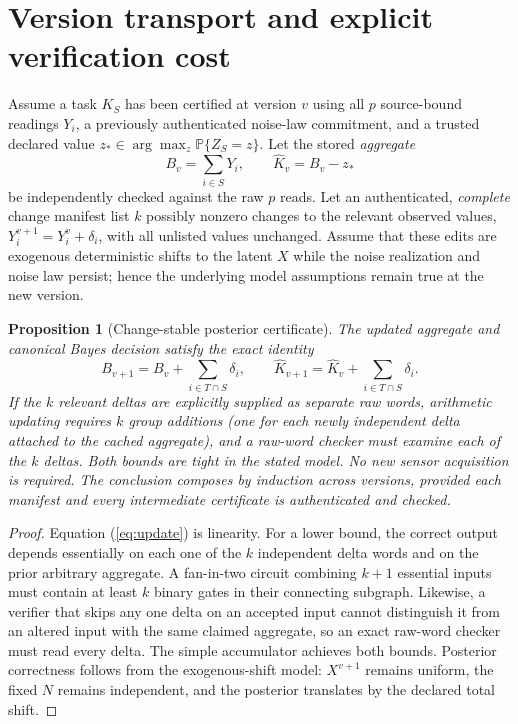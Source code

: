 \documentclass[11pt,letterpaper]{article}
\newtheorem{proposition}[theorem]{Proposition}
\newcommand{\Prb}{\mathbb P}
\begin{document}
\section{Version transport and explicit verification cost}
Assume a task \(K_S\) has been certified at version \(v\) using all \(p\) source-bound readings \(Y_i\), a previously authenticated noise-law commitment, and a trusted declared value \(z_*\in\arg\max_z\Prb\{Z_S=z\}\). Let the stored \emph{aggregate}\[B_v=\sum_{i\in S}Y_i,\qquad \hat K_v=B_v-z_*\] be independently checked against the raw \(p\) reads. Let an authenticated, \emph{complete} change manifest list \(k\) possibly nonzero changes to the relevant observed values, \(Y_i^{v+1}=Y_i^{v}+\delta_i\), with all unlisted values unchanged. Assume that these edits are exogenous deterministic shifts to the latent \(X\) while the noise realization and noise law persist; hence the underlying model assumptions remain true at the new version.

\begin{proposition}[Change-stable posterior certificate]\label{prop:update}
The updated aggregate and canonical Bayes decision satisfy the exact identity
\begin{equation}\label{eq:update}
B_{v+1}=B_v+\sum_{i\in T\cap S}\delta_i,
\qquad
\hat K_{v+1}=\hat K_v+\sum_{i\in T\cap S}\delta_i.
\end{equation}
If the \(k\) relevant deltas are explicitly supplied as separate raw words, arithmetic updating requires \(k\) group additions (one for each newly independent delta attached to the cached aggregate), and a raw-word checker must examine each of the \(k\) deltas. Both bounds are tight in the stated model. No new sensor acquisition is required. The conclusion composes by induction across versions, provided each manifest and every intermediate certificate is authenticated and checked.
\end{proposition}
\begin{proof}
Equation (\ref{eq:update}) is linearity. For a lower bound, the correct output depends essentially on each one of the \(k\) independent delta words and on the prior arbitrary aggregate. A fan-in-two circuit combining \(k+1\) essential inputs must contain at least \(k\) binary gates in their connecting subgraph. Likewise, a verifier that skips any one delta on an accepted input cannot distinguish it from an altered input with the same claimed aggregate, so an exact raw-word checker must read every delta. The simple accumulator achieves both bounds. Posterior correctness follows from the exogenous-shift model: \(X^{v+1}\) remains uniform, the fixed \(N\) remains independent, and the posterior translates by the declared total shift.
\end{proof}
\end{document}

